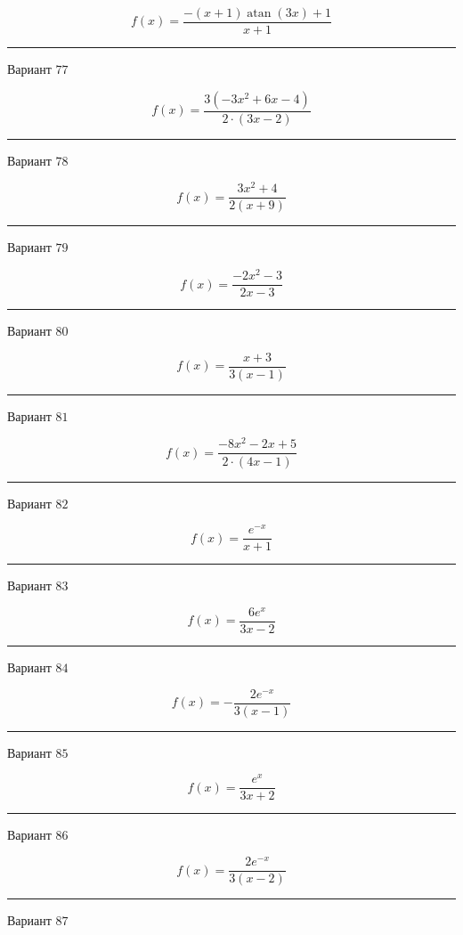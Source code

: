 \documentclass[11pt]{report}
\begin{document}
$$f(x) = \frac{- \left(x + 1\right) \operatorname{atan}{\left(3 x \right)} + 1}{x + 1}$$
\begin{center}
\noindent\rule{8cm}{0.4pt}
\end{center}
Вариант $77$


$$f(x) = \frac{3 \left(- 3 x^{2} + 6 x - 4\right)}{2 \cdot \left(3 x - 2\right)}$$
\begin{center}
\noindent\rule{8cm}{0.4pt}
\end{center}
Вариант $78$


$$f(x) = \frac{3 x^{2} + 4}{2 \left(x + 9\right)}$$
\begin{center}
\noindent\rule{8cm}{0.4pt}
\end{center}
Вариант $79$


$$f(x) = \frac{- 2 x^{2} - 3}{2 x - 3}$$
\begin{center}
\noindent\rule{8cm}{0.4pt}
\end{center}
Вариант $80$


$$f(x) = \frac{x + 3}{3 \left(x - 1\right)}$$
\begin{center}
\noindent\rule{8cm}{0.4pt}
\end{center}
Вариант $81$


$$f(x) = \frac{- 8 x^{2} - 2 x + 5}{2 \cdot \left(4 x - 1\right)}$$
\begin{center}
\noindent\rule{8cm}{0.4pt}
\end{center}
Вариант $82$


$$f(x) = \frac{e^{- x}}{x + 1}$$
\begin{center}
\noindent\rule{8cm}{0.4pt}
\end{center}
Вариант $83$


$$f(x) = \frac{6 e^{x}}{3 x - 2}$$
\begin{center}
\noindent\rule{8cm}{0.4pt}
\end{center}
Вариант $84$


$$f(x) = - \frac{2 e^{- x}}{3 \left(x - 1\right)}$$
\begin{center}
\noindent\rule{8cm}{0.4pt}
\end{center}
Вариант $85$


$$f(x) = \frac{e^{x}}{3 x + 2}$$
\begin{center}
\noindent\rule{8cm}{0.4pt}
\end{center}
Вариант $86$


$$f(x) = \frac{2 e^{- x}}{3 \left(x - 2\right)}$$
\begin{center}
\noindent\rule{8cm}{0.4pt}
\end{center}
Вариант $87$
\end{document}
